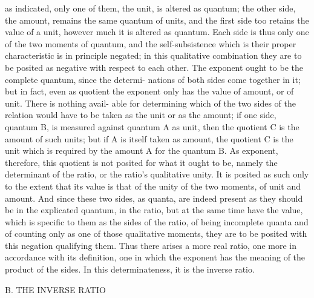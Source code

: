 as indicated, only one of them, the unit, is altered as quantum; the other
side, the amount, remains the same quantum of units, and the first side too
retains the value of a unit, however much it is altered as quantum. Each side
is thus only one of the two moments of quantum, and the self-subsistence
which is their proper characteristic is in principle negated; in this qualitative
combination they are to be posited as negative with respect to each other.
The exponent ought to be the complete quantum, since the determi-
nations of both sides come together in it; but in fact, even as quotient the
exponent only has the value of amount, or of unit. There is nothing avail-
able for determining which of the two sides of the relation would have to
be taken as the unit or as the amount; if one side, quantum B, is measured
against quantum A as unit, then the quotient C is the amount of such
units; but if A is itself taken as amount, the quotient C is the unit which is
required by the amount A for the quantum B. As exponent, therefore, this
quotient is not posited for what it ought to be, namely the determinant
of the ratio, or the ratio’s qualitative unity. It is posited as such only to
the extent that its value is that of the unity of the two moments, of unit
and amount. And since these two sides, as quanta, are indeed present as
they should be in the explicated quantum, in the ratio, but at the same
time have the value, which is specific to them as the sides of the ratio, of
being incomplete quanta and of counting only as one of those qualitative
moments, they are to be posited with this negation qualifying them. Thus
there arises a more real ratio, one more in accordance with its definition,
one in which the exponent has the meaning of the product of the sides. In
this determinateness, it is the inverse ratio.

B. THE INVERSE RATIO

